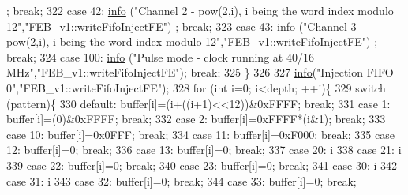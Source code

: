 \begin{DoxyCode}
      ; \textcolor{keywordflow}{break};
322   \textcolor{keywordflow}{case} 42:  \hyperlink{classObject_a644fd329ea4cb85f54fa6846484b84a8}{info} (\textcolor{stringliteral}{"Channel 2 - pow(2,i), i being the word index modulo 12"},\textcolor{stringliteral}{"FEB\_v1::writeFifoInjectFE"})
      ; \textcolor{keywordflow}{break};
323   \textcolor{keywordflow}{case} 43:  \hyperlink{classObject_a644fd329ea4cb85f54fa6846484b84a8}{info} (\textcolor{stringliteral}{"Channel 3 - pow(2,i), i being the word index modulo 12"},\textcolor{stringliteral}{"FEB\_v1::writeFifoInjectFE"})
      ; \textcolor{keywordflow}{break};
324   \textcolor{keywordflow}{case} 100:  \hyperlink{classObject_a644fd329ea4cb85f54fa6846484b84a8}{info} (\textcolor{stringliteral}{"Pulse mode - clock running at 40/16 MHz"},\textcolor{stringliteral}{"FEB\_v1::writeFifoInjectFE"}); \textcolor{keywordflow}{break};
325   \}
326 
327   \hyperlink{classObject_a644fd329ea4cb85f54fa6846484b84a8}{info}(\textcolor{stringliteral}{"Injection FIFO 0"},\textcolor{stringliteral}{"FEB\_v1::writeFifoInjectFE"});        
328   \textcolor{keywordflow}{for} (\textcolor{keywordtype}{int} i=0; i<depth; ++i)\{
329     \textcolor{keywordflow}{switch} (pattern)\{
330     \textcolor{keywordflow}{default}: buffer[i]=(i+((i+1)<<12))&0xFFFF; \textcolor{keywordflow}{break};
331     \textcolor{keywordflow}{case} 1:   buffer[i]=(0)&0xFFFF; \textcolor{keywordflow}{break};
332     \textcolor{keywordflow}{case} 2:   buffer[i]=0xFFFF*(i&1); \textcolor{keywordflow}{break};
333     \textcolor{keywordflow}{case} 10:  buffer[i]=0x0FFF; \textcolor{keywordflow}{break};
334     \textcolor{keywordflow}{case} 11:  buffer[i]=0xF000; \textcolor{keywordflow}{break};
335     \textcolor{keywordflow}{case} 12:  buffer[i]=0; \textcolor{keywordflow}{break};
336     \textcolor{keywordflow}{case} 13:  buffer[i]=0; \textcolor{keywordflow}{break};
337     \textcolor{keywordflow}{case} 20:  i%
338     \textcolor{keywordflow}{case} 21:  i%
339     \textcolor{keywordflow}{case} 22:  buffer[i]=0; \textcolor{keywordflow}{break};
340     \textcolor{keywordflow}{case} 23:  buffer[i]=0; \textcolor{keywordflow}{break};
341     \textcolor{keywordflow}{case} 30:  i%
342     \textcolor{keywordflow}{case} 31:  i%
343     \textcolor{keywordflow}{case} 32:  buffer[i]=0; \textcolor{keywordflow}{break};
344     \textcolor{keywordflow}{case} 33:  buffer[i]=0; \textcolor{keywordflow}{break};

\end{DoxyCode}
